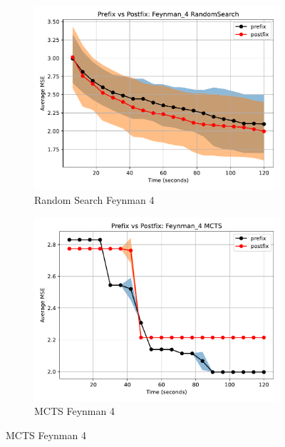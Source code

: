 \documentclass[runningheads]{llncs}
\begin{document}
\begin{figure}
    \centering
    
    \begin{subfigure}[b]{0.4\textwidth}
        \includegraphics[width=\linewidth, keepaspectratio]{AIFeynman_Benchmarks/PrePostFeynman_4RandomSearch.pdf}
        \caption{Random Search Feynman 4}
        \label{subfig:feynman_4_RS}
    \end{subfigure}
    \begin{subfigure}[b]{0.4\textwidth}
        \includegraphics[width=\linewidth, keepaspectratio]{AIFeynman_Benchmarks/PrePostFeynman_4MCTS.pdf}
        \caption{MCTS Feynman 4}
        \label{subfig:feynman_4_MCTS}
    \end{subfigure}
    

\end{figure}
\end{document}
